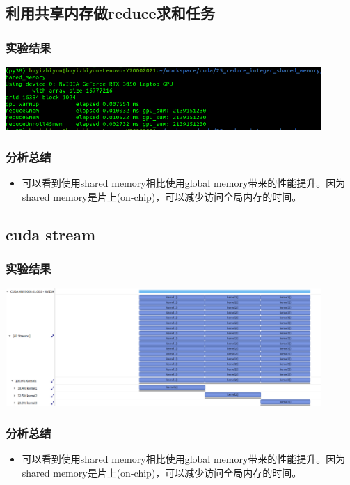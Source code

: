 \subsection{利用共享内存做reduce求和任务}
\subsubsection{实验结果}
\noindent
\includegraphics[width=0.9\textwidth]{assets/smem.png}
\subsubsection{分析总结}
\noindent
\begin{itemize}
	\item 可以看到使用shared memory相比使用global memory带来的性能提升。因为shared memory是片上(on-chip)，可以减少访问全局内存的时间。
\end{itemize}

\subsection{cuda stream}
\subsubsection{实验结果}
\noindent
\includegraphics[width=0.9\textwidth]{assets/stream.png}
\subsubsection{分析总结}
\noindent
\begin{itemize}
	\item 可以看到使用shared memory相比使用global memory带来的性能提升。因为shared memory是片上(on-chip)，可以减少访问全局内存的时间。
\end{itemize}



